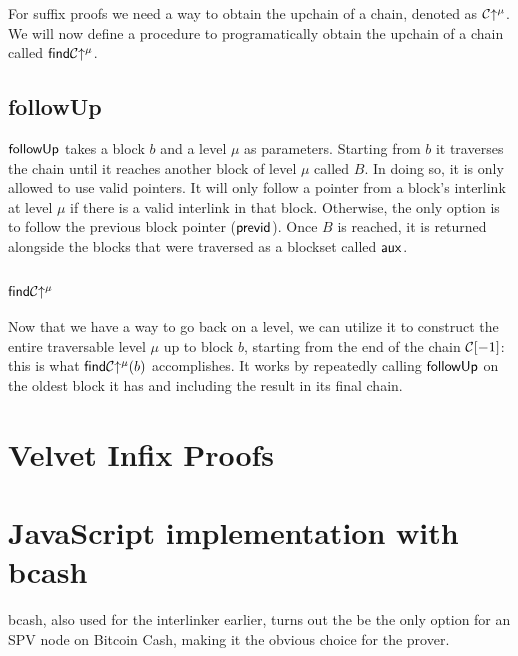 For suffix proofs we need a way to obtain the upchain of a chain, denoted as $\mathcal{C}\negthickspace\uparrow^\mu$. We will now define a procedure to programatically obtain the upchain of a chain called $\sf find \mathcal{C}\negthickspace\uparrow^\mu$.

\subsection{\sf followUp}
$\sf followUp$ takes a block $b$ and a level $\mu$ as parameters. Starting from $b$ it traverses the chain until it reaches another block of level $\mu$ called $B$. In doing so, it is only allowed to use valid pointers. It will only follow a pointer from a block's interlink at level $\mu$ if there is a valid interlink in that block. Otherwise, the only option is to follow the previous block pointer ($\sf previd$). Once $B$ is reached, it is returned alongside the blocks that were traversed as a blockset called $\sf aux$.




\subsection{$\sf find \mathcal{C}\negthickspace\uparrow^\mu$}
Now that we have a way to go back on a level, we can utilize it to construct the entire traversable level $\mu$ up to block $b$, starting from the end of the chain $\mathcal{C}[-1]$: this is what ${\sf find \mathcal{C}\negthickspace\uparrow^\mu}(b)$ accomplishes. It works by repeatedly calling $\sf followUp$ on the oldest block it has and including the result in its final chain.



\section{Velvet Infix Proofs}



\section{JavaScript implementation with bcash}
bcash, also used for the interlinker earlier, turns out the be the only option for an SPV node on Bitcoin Cash, making it the obvious choice for the prover.

